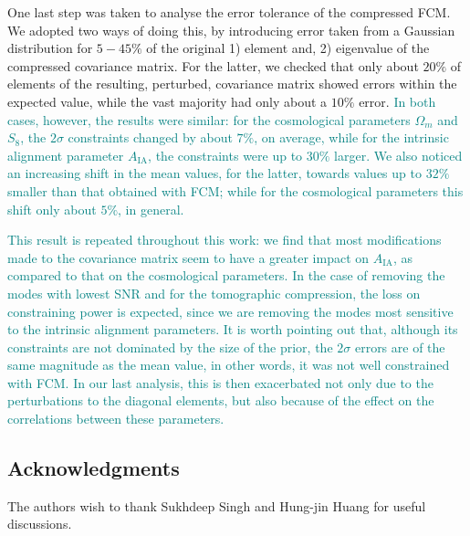 \documentclass[twocolumn]{\docclass}
\newcommand\full{FCM}
\begin{document}
	One last step was taken to analyse the error tolerance of the compressed \full. We adopted two ways of doing this, by introducing error taken from a Gaussian distribution for $5 - 45 \%$ of the original 1) element and, 2) eigenvalue of the compressed covariance matrix. For the latter, we checked that only about $20 \%$ of elements of the resulting, perturbed, covariance matrix showed errors within the expected value, while the vast majority had only about a $10\%$ error. \textcolor{teal}{In both cases, however, the results were similar: for the cosmological parameters $\Omega_m$ and $S_8$, the $2\sigma$ constraints changed by about $7\%$, on average, while for the intrinsic alignment parameter $A_{\mathrm{IA}}$, the constraints were up to $30\%$ larger. We also noticed an increasing shift in the mean values, for the latter, towards values up to $32\%$ smaller than that obtained with \full; while for the cosmological parameters this shift only about $5\%$, in general.}
	
	\textcolor{teal}{This result is repeated throughout this work: we find that most modifications made to the covariance matrix seem to have a greater impact on $A_{\mathrm{IA}}$, as compared to that on the cosmological parameters. In the case of removing the modes with lowest SNR and for the tomographic compression, the loss on constraining power is expected, since we are removing the modes most sensitive to the intrinsic alignment parameters. It is worth pointing out that, although its constraints are not dominated by the size of the prior, the $2\sigma$ errors are of the same magnitude as the mean value, in other words, it was not well constrained with \full. In our last analysis, this is then exacerbated not only due to the perturbations to the diagonal elements, but also because of the effect on the correlations between these parameters.}
	
	\subsection*{Acknowledgments}
	
	The authors wish to thank Sukhdeep Singh and Hung-jin Huang for useful discussions.
	
	
\end{document}
